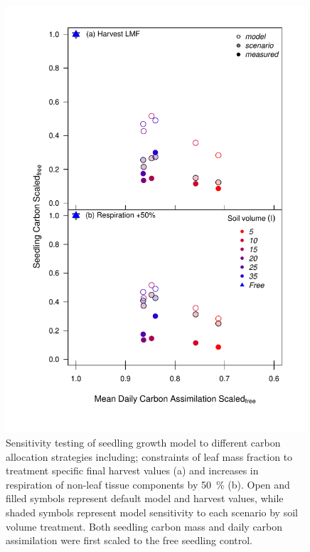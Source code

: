 \documentclass[a4paper]{article}\usepackage[]{graphicx}\usepackage[]{color}
\begin{document}
\begin{figure}[h!]
    \centering
    \includegraphics[width=0.99\textwidth]{massmodel_resp.pdf}
    \caption{Sensitivity testing of seedling growth model to different carbon allocation strategies including; constraints of leaf mass fraction to treatment specific final harvest values (a) and increases in respiration of non-leaf tissue components by 50~\% (b).  Open and filled symbols represent default model and harvest values, while shaded symbols represent model sensitivity to each scenario by soil volume treatment. Both seedling carbon mass and daily carbon assimilation were first scaled to the free seedling control.}
    \label{fig:figureSI1}
\end{figure}
\end{document}

